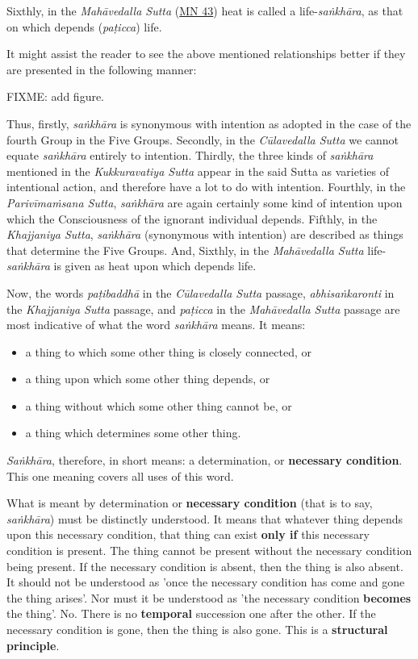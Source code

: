 Sixthly, in the \emph{Mahāvedalla Sutta} (\href{https://suttacentral.net/mn43/en/sujato}{MN 43}) heat is called a life-\emph{saṅkhāra}, as that on which depends (\emph{paṭicca}) life.

It might assist the reader to see the above mentioned relationships better if they are presented in the following manner:

FIXME: add figure.

Thus, firstly, \emph{saṅkhāra} is synonymous with intention as adopted in the case of the fourth Group in the Five Groups. Secondly, in the \emph{Cūlavedalla Sutta} we cannot equate \emph{saṅkhāra} entirely to intention. Thirdly, the three kinds of \emph{saṅkhāra} mentioned in the \emph{Kukkuravatiya Sutta} appear in the said Sutta as varieties of intentional action, and therefore have a lot to do with intention. Fourthly, in the \emph{Parivīmaṁsana Sutta}, \emph{saṅkhāra} are again certainly some kind of intention upon which the Consciousness of the ignorant individual depends. Fifthly, in the \emph{Khajjaniya Sutta}, \emph{saṅkhāra} (synonymous with intention) are described as things that determine the Five Groups. And, Sixthly, in the \emph{Mahāvedalla Sutta} life-\emph{saṅkhāra} is given as heat upon which depends life.

Now, the words \emph{paṭibaddhā} in the \emph{Cūlavedalla Sutta} passage, \emph{abhisaṅkaronti} in the \emph{Khajjaniya Sutta} passage, and \emph{paṭicca} in the \emph{Mahāvedalla Sutta} passage are most indicative of what the word \emph{saṅkhāra} means. It means:

\begin{itemize}
\item
  a thing to which some other thing is closely connected, or
\item
  a thing upon which some other thing depends, or
\item
  a thing without which some other thing cannot be, or
\item
  a thing which determines some other thing.
\end{itemize}

\emph{Saṅkhāra}, therefore, in short means: a determination, or \textbf{necessary condition}. This one meaning covers all uses of this word.

What is meant by determination or \textbf{necessary condition} (that is to say, \emph{saṅkhāra}) must be distinctly understood. It means that whatever thing depends upon this necessary condition, that thing can exist \textbf{only if} this necessary condition is present. The thing cannot be present without the necessary condition being present. If the necessary condition is absent, then the thing is also absent. It should not be understood as 'once the necessary condition has come and gone the thing arises'. Nor must it be understood as 'the necessary condition \textbf{becomes} the thing'. No. There is no \textbf{temporal} succession one after the other. If the necessary condition is gone, then the thing is also gone. This is a \textbf{structural principle}.

